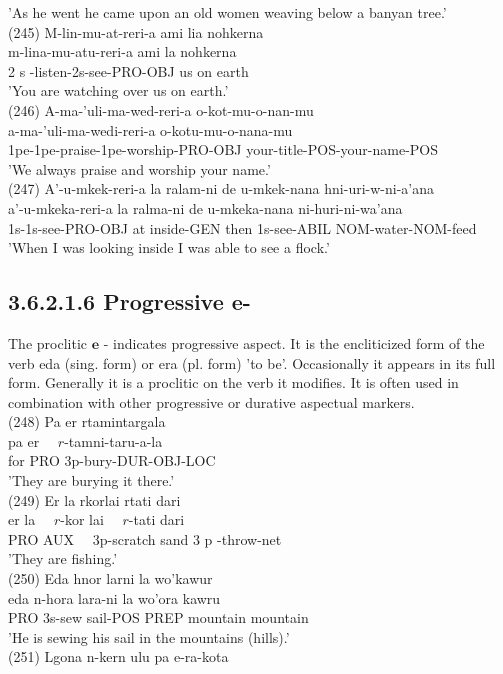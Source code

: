 \documentclass[10pt]{article}
\begin{document}
'As he went he came upon an old women weaving below a banyan tree.'\\
(245) M-lin-mu-at-reri-a ami lia nohkerna\\
m-lina-mu-atu-reri-a ami la nohkerna\\
2 s -listen-2s-see-PRO-OBJ us on earth\\
'You are watching over us on earth.'\\
(246) A-ma-'uli-ma-wed-reri-a o-kot-mu-o-nan-mu\\
a-ma-'uli-ma-wedi-reri-a o-kotu-mu-o-nana-mu\\
1pe-1pe-praise-1pe-worship-PRO-OBJ your-title-POS-your-name-POS\\
'We always praise and worship your name.'\\
(247) A'-u-mkek-reri-a la ralam-ni de u-mkek-nana hni-uri-w-ni-a'ana\\
a'-u-mkeka-reri-a la ralma-ni de u-mkeka-nana ni-huri-ni-wa’ana\\
1s-1s-see-PRO-OBJ at inside-GEN then 1s-see-ABIL NOM-water-NOM-feed\\
'When I was looking inside I was able to see a flock.'

\subsection*{3.6.2.1.6 Progressive e-}
The proclitic \(\boldsymbol{e}\) - indicates progressive aspect. It is the encliticized form of the verb eda (sing. form) or era (pl. form) 'to be'. Occasionally it appears in its full form. Generally it is a proclitic on the verb it modifies. It is often used in combination with other progressive or durative aspectual markers.\\
(248) Pa er rtamintargala\\
pa er \(\quad r\)-tamni-taru-a-la\\
for PRO 3p-bury-DUR-OBJ-LOC\\
'They are burying it there.'\\
(249) Er la rkorlai rtati dari\\
er la \(\quad r\)-kor lai \(\quad r\)-tati dari\\
PRO AUX \(\quad 3 \mathrm{p}\)-scratch sand 3 p -throw-net\\
'They are fishing.'\\
(250) Eda hnor larni la wo'kawur\\
eda n-hora lara-ni la wo'ora kawru\\
PRO 3s-sew sail-POS PREP mountain mountain\\
'He is sewing his sail in the mountains (hills).'\\
(251) Lgona n-kern ulu pa e-ra-kota
\end{document}
